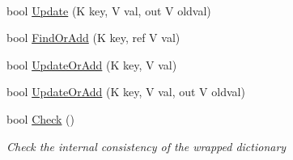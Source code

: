 \begin{DoxyCompactItemize}
$$\item 
bool \hyperlink{class_c5_1_1_guarded_dictionary_a74de4c990cdc8e7b5245d2931c71274e}{Update} (K key, V val, out V oldval)
\item 
bool \hyperlink{class_c5_1_1_guarded_dictionary_ab276e6b0828e40022f2b3ef39e22305c}{Find\+Or\+Add} (K key, ref V val)
\item 
bool \hyperlink{class_c5_1_1_guarded_dictionary_a4d75103d8bfec4c044a22ed8ec7fdf46}{Update\+Or\+Add} (K key, V val)
\item 
bool \hyperlink{class_c5_1_1_guarded_dictionary_a8b6c55913a3f297ea9579800a9be6580}{Update\+Or\+Add} (K key, V val, out V oldval)
\item 
bool \hyperlink{class_c5_1_1_guarded_dictionary_a366d84d2fd3b966b091e030cd8ff131b}{Check} ()
\begin{DoxyCompactList}\small\item\em Check the internal consistency of the wrapped dictionary \end{DoxyCompactList}\end{DoxyCompactItemize}
